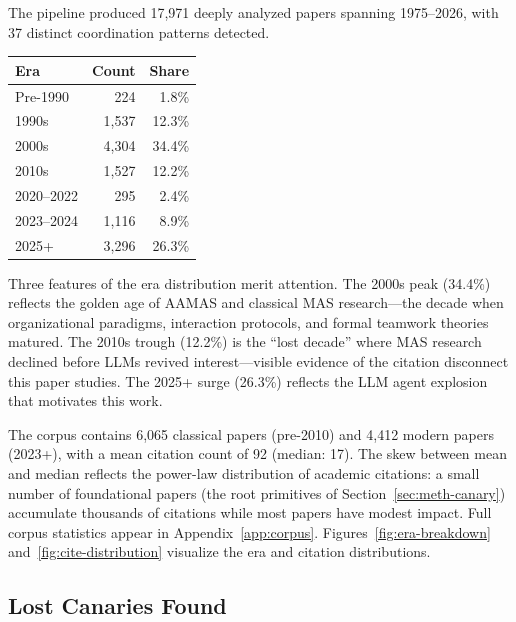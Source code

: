 \documentclass{article}
\begin{document}
The pipeline produced 17,971 deeply analyzed papers spanning 1975--2026, with 37
distinct coordination patterns detected.

\begin{center}
\begin{tabular}{@{} l r r @{}}
\toprule
\textbf{Era} & \textbf{Count} & \textbf{Share} \\
\midrule
Pre-1990 & 224 & 1.8\% \\
1990s & 1,537 & 12.3\% \\
2000s & 4,304 & 34.4\% \\
2010s & 1,527 & 12.2\% \\
2020--2022 & 295 & 2.4\% \\
2023--2024 & 1,116 & 8.9\% \\
2025+ & 3,296 & 26.3\% \\
\bottomrule
\end{tabular}
\end{center}

\noindent
Three features of the era distribution merit attention. The 2000s peak (34.4\%) reflects
the golden age of AAMAS and classical MAS research---the decade when organizational
paradigms, interaction protocols, and formal teamwork theories matured. The 2010s trough
(12.2\%) is the ``lost decade'' where MAS research declined before LLMs revived
interest---visible evidence of the citation disconnect this paper studies. The 2025+
surge (26.3\%) reflects the LLM agent explosion that motivates this work.

The corpus contains 6,065 classical papers (pre-2010) and 4,412 modern papers (2023+),
with a mean citation count of 92 (median: 17). The skew between mean and median
reflects the power-law distribution of academic citations: a small number of foundational
papers (the root primitives of Section~\ref{sec:meth-canary}) accumulate thousands of
citations while most papers have modest impact. Full corpus statistics appear in
Appendix~\ref{app:corpus}. Figures~\ref{fig:era-breakdown} and~\ref{fig:cite-distribution}
visualize the era and citation distributions.




\subsection{Lost Canaries Found}
\label{sec:res-canaries}
\end{document}
